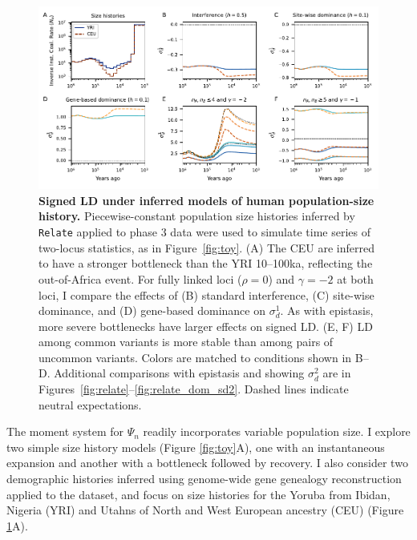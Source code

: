 \documentclass[]{article}
\begin{document}
\begin{figure}[tb!]
    \centering
    \includegraphics{../figures/demog_YRI_CEU.dominance}
    \caption{
        \textbf{Signed LD under inferred models of human population-size history.}
        Piecewise-constant population size histories inferred by \texttt{Relate} applied to
        \citet{1000_Genomes_Project_Consortium2015-zq} phase 3 data were used to
        simulate time series of two-locus statistics, as in Figure~\ref{fig:toy}.
        (A) The CEU are inferred to have a stronger bottleneck than the YRI
        10--100ka, reflecting the out-of-Africa event.
        For fully linked loci (\(\rho=0\)) and \(\gamma=-2\) at both loci,
        I compare the effects of
        (B) standard interference, (C) site-wise dominance, and (D) gene-based
        dominance on \(\sigma_d^1\).
        As with epistasis, more severe bottlenecks have larger effects on signed LD.
        (E, F) LD among common variants is more stable than among pairs of
        uncommon variants. Colors are matched to conditions shown in B--D.
        Additional comparisons with epistasis and showing \(\sigma_d^2\) are
        in Figures~\ref{fig:relate}--\ref{fig:relate_dom_sd2}.
        Dashed lines indicate neutral expectations.
    }
    \label{fig:relate_dom}
\end{figure}

The moment system for \(\Psi_n\) readily incorporates variable population size.
I explore two simple size history models (Figure \ref{fig:toy}A), one with an
instantaneous expansion and another with a bottleneck followed by recovery. I
also consider two demographic histories inferred using genome-wide gene
genealogy reconstruction \citep{Speidel2019-nj} applied to the
\citet{1000_Genomes_Project_Consortium2015-zq} dataset, and focus on size
histories for the Yoruba from Ibidan, Nigeria (YRI) and Utahns of North and
West European ancestry (CEU) (Figure \ref{fig:relate_dom}A).
\end{document}
